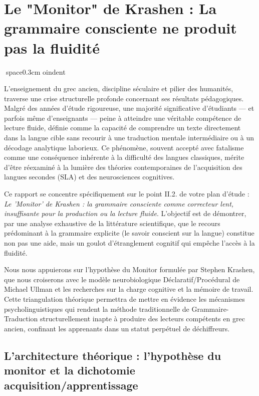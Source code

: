 

\section{Le "Monitor" de Krashen : La grammaire consciente ne produit pas la fluidité}
space{0.3cm}
oindent

L'enseignement du grec ancien, discipline séculaire et pilier des humanités, traverse une crise
structurelle profonde concernant ses résultats pédagogiques. Malgré des années d'étude rigoureuse,
une majorité significative d'étudiants — et parfois même d'enseignants — peine à atteindre une
véritable compétence de lecture fluide, définie comme la capacité de comprendre un texte directement
dans la langue cible sans recourir à une traduction mentale intermédiaire ou à un décodage
analytique laborieux.\cite{II-2-3-ref1} Ce phénomène, souvent accepté avec fatalisme comme une
conséquence inhérente à la difficulté des langues classiques, mérite d'être réexaminé à la lumière
des théories contemporaines de l'acquisition des langues secondes (SLA) et des neurosciences
cognitives.

Ce rapport se concentre spécifiquement sur le point II.2.\cite{II-2-3-ref3} de votre plan d'étude :
\textit{\og Le 'Monitor' de Krashen : la grammaire consciente comme correcteur lent, insuffisante
pour la production ou la lecture fluide\fg{}}. L'objectif est de démontrer, par une analyse
exhaustive de la littérature scientifique, que le recours prédominant à la grammaire explicite (le
savoir conscient sur la langue) constitue non pas une aide, mais un goulot d'étranglement cognitif
qui empêche l'accès à la fluidité.

Nous nous appuierons sur l'hypothèse du Monitor formulée par Stephen Krashen, que nous croiserons
avec le modèle neurobiologique Déclaratif/Procédural de Michael Ullman et les recherches sur la
charge cognitive et la mémoire de travail. Cette triangulation théorique permettra de mettre en
évidence les mécanismes psycholinguistiques qui rendent la méthode traditionnelle de \og Grammaire-
Traduction\fg{} structurellement inapte à produire des lecteurs compétents en grec ancien, confinant
les apprenants dans un statut perpétuel de \og déchiffreurs\fg{}.\cite{II-2-3-ref2}



\subsection{L'architecture théorique : l'hypothèse du monitor et la dichotomie acquisition/apprentissage}

